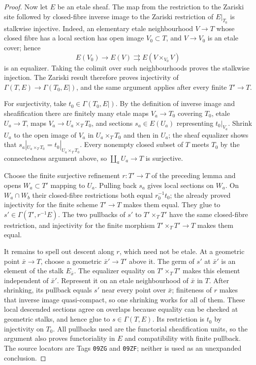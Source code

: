 \begin{proof}
Now let $E$ be an etale sheaf.  The map from the restriction to the Zariski
site followed by closed-fibre inverse image to the Zariski restriction of
$E|_{T_0}$ is stalkwise injective.  Indeed, an elementary etale
neighbourhood $V\to T$ whose closed fibre has a local section has open image
$V_0\subset T$, and $V\to V_0$ is an etale cover; hence
\[
 E(V_0)\longrightarrow E(V)
 \rightrightarrows E(V\times_{V_0}V)
\]
is an equalizer.  Taking the colimit over such neighbourhoods proves the
stalkwise injection.  The Zariski result therefore proves injectivity of
$\Gamma(T,E)\to\Gamma(T_0,E|)$, and the same argument applies after every
finite $T'\to T$.

For surjectivity, take $t_0\in\Gamma(T_0,E|)$.  By the definition of inverse
image and sheafification there are finitely many etale maps $V_a\to T_0$
covering $T_0$, etale $U_a\to T$, maps $V_a\to U_a\times_TT_0$, and
sections $s_a\in E(U_a)$ representing $t_0|_{V_a}$.  Shrink $U_a$ to the
open image of $V_a$ in $U_a\times_TT_0$ and then in $U_a$; the sheaf
equalizer shows that $s_a|_{U_a\times_TT_0}=t_0|_{U_a\times_TT_0}$.  Every
nonempty closed subset of $T$ meets $T_0$ by the connectedness argument
above, so $\coprod_aU_a\to T$ is surjective.

Choose the finite surjective refinement $r:T'\to T$ of the preceding lemma
and opens $W_a\subset T'$ mapping to $U_a$.  Pulling back $s_a$ gives local
sections on $W_a$.  On $W_a\cap W_b$ their closed-fibre restrictions both
equal $r_0^{-1}t_0$; the already proved injectivity for the finite scheme
$T'\to T$ makes them equal.  They glue to $s'\in\Gamma(T',r^{-1}E)$.
The two pullbacks of $s'$ to $T'\times_TT'$ have the same closed-fibre
restriction, and injectivity for the finite morphism
$T'\times_TT'\to T$ makes them equal.

It remains to spell out descent along $r$, which need not be etale.  At a
geometric point $\bar x\to T$, choose a geometric $\bar x'\to T'$ above it.
The germ of $s'$ at $\bar x'$ is an element of the stalk $E_{\bar x}$.
The equalizer equality on $T'\times_TT'$ makes this element independent of
$\bar x'$.  Represent it on an etale neighbourhood of $\bar x$ in $T$.
After shrinking, its pullback equals $s'$ near every point over $\bar x$;
finiteness of $r$ makes that inverse image quasi-compact, so one shrinking
works for all of them.  These local descended sections agree on overlaps
because equality can be checked at geometric stalks, and hence glue to
$s\in\Gamma(T,E)$.  Its restriction is $t_0$ by injectivity on $T_0$.
All pullbacks used are the functorial sheafification units, so the argument
also proves functoriality in $E$ and compatibility with finite pullback.  The
source locators are Tags \texttt{09ZG} and \texttt{09ZF}; neither is used as
an unexpanded conclusion.
\end{proof}

